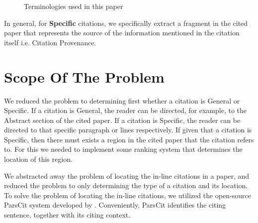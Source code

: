 \begin{figure}[h]
\label{fig:terminology}
\caption{Terminologies used in this paper}
\end{figure}

In general, for \textbf{Specific} citations, we specifically extract a fragment in the cited paper that represents the source of the information mentioned in the citation itself i.e. Citation Provenance.

\section{Scope Of The Problem}
We reduced the problem to determining first whether a citation is General or Specific. If a citation is General, the reader can be directed, for example, to the Abstract section of the cited paper. If a citation is Specific, the reader can be directed to that specific paragraph or lines respectively. If given that a citation is Specific, then there must exists a region in the cited paper that the citation refers to. For this we needed to implement some ranking system that determines the location of this region.

We abstracted away the problem of locating the in-line citations in a paper, and reduced the problem to only determining the type of a citation and its location. To solve the problem of locating the in-line citations, we utilized the open-source ParsCit system developed by . Conveniently, ParsCit identifies the citing sentence, together with its citing context.

